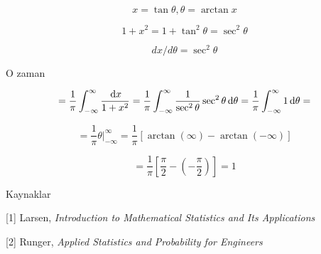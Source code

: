 \documentclass[12pt,fleqn]{article}\usepackage{../../common}
\begin{document}
$$  x = \tan \theta, \theta = \arctan x $$

$$ 1 + x^2 = 1 + \tan^2\theta = \sec^2\theta$$

$$ dx / d\theta = \sec^2\theta $$

O zaman 

$$ =
\frac{ 1}{\pi} \int_{ -\infty}^{\infty} \frac{\,\mathrm{d} x}{1 + x^2}   =
\frac{ 1}{\pi} \int_{ -\infty}^{\infty}  \frac{ 1}{\sec^2\theta}\sec^2\theta \,\mathrm{d}\theta = 
\frac{ 1}{\pi} \int_{ -\infty}^{\infty}  1 \,\mathrm{d}\theta = 
$$

$$ = 
\frac{ 1}{\pi} \theta |_{ -\infty}^{\infty}   = 
\frac{ 1}{\pi} [\arctan(\infty) - \arctan(-\infty)]
 $$

$$ =
\frac{ 1}{\pi} [\frac{ \pi}{2} - (-\frac{ \pi}{2}) ] = 1
 $$



Kaynaklar

[1] Larsen, {\em Introduction to Mathematical Statistics and Its Applications}

[2] Runger, {\em Applied Statistics and Probability for Engineers}
\end{document}
